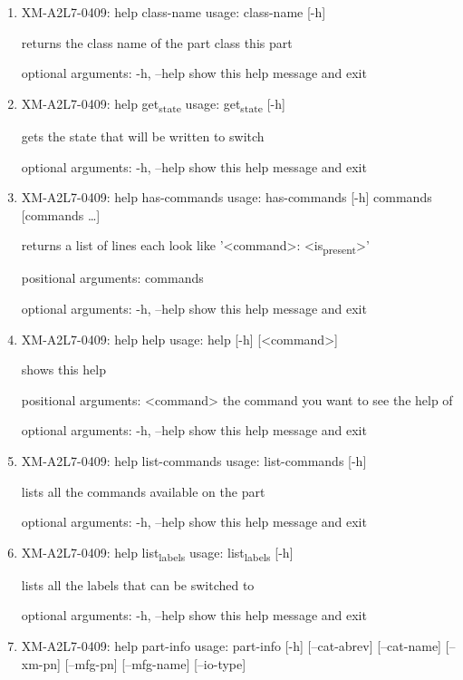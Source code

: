 \documentclass[11pt]{article}
\begin{document}
\begin{enumerate}
\item XM-A2L7-0409: help class-name
\label{sec:orga6f3de7}
usage: class-name [-h]

returns the class name of the part class this part

optional arguments:
  -h, --help  show this help message and exit

\item XM-A2L7-0409: help get\textsubscript{state}
\label{sec:orgb37be8a}
usage: get\textsubscript{state} [-h]

gets the state that will be written to switch

optional arguments:
  -h, --help  show this help message and exit

\item XM-A2L7-0409: help has-commands
\label{sec:org40fe16f}
usage: has-commands [-h] commands [commands \ldots{}]

returns a list of lines each look like '<command>: <is\textsubscript{present}>'

positional arguments:
  commands

optional arguments:
  -h, --help  show this help message and exit

\item XM-A2L7-0409: help help
\label{sec:orgcadf18d}
usage: help [-h] [<command>]

shows this help

positional arguments:
  <command>   the command you want to see the help of

optional arguments:
  -h, --help  show this help message and exit

\item XM-A2L7-0409: help list-commands
\label{sec:orgab2625c}
usage: list-commands [-h]

lists all the commands available on the part

optional arguments:
  -h, --help  show this help message and exit

\item XM-A2L7-0409: help list\textsubscript{labels}
\label{sec:orgd44f6c6}
usage: list\textsubscript{labels} [-h]

lists all the labels that can be switched to

optional arguments:
  -h, --help  show this help message and exit

\item XM-A2L7-0409: help part-info
\label{sec:orga191aee}
usage: part-info  [-h] [--cat-abrev] [--cat-name] [--xm-pn] [--mfg-pn] [--mfg-name]
        [--io-type]


\end{enumerate}
\end{document}
